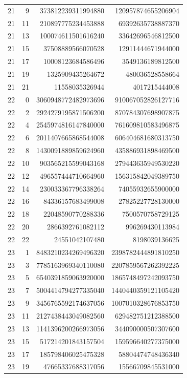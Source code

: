 \begin{longtable}{@{}rrrr@{}}
21 & 9 & 373812239311994880 & 120957874655206904\\
21 & 11 & 210897775234453888 & 69392635738887370\\
21 & 13 & 100074611501616240 & 33642696546812500\\
21 & 15 & 37508889566070528 & 12911444671944000\\
21 & 17 & 10008123684586496 & 3549136189812500\\
21 & 19 & 1325909435264672 & 480036528558664\\
21 & 21 & 11558035326944 & 4017215444008\\
22 & 0 & 3060948772482973696 & 910067052826127716\\
22 & 2 & 2924279195871506200 & 870784307698907875\\
22 & 4 & 2545974816147840000 & 761609810583496875\\
22 & 6 & 2011407665868544008 & 606404681680313750\\
22 & 8 & 1430091889859624960 & 435886931898469500\\
22 & 10 & 903565215599043168 & 279443635949530220\\
22 & 12 & 496557444710664960 & 156315842049389750\\
22 & 14 & 230033367796338264 & 74055932655900000\\
22 & 16 & 84336157683499008 & 27825227728130000\\
22 & 18 & 22048590770288336 & 7500570758729125\\
22 & 20 & 2866392761082112 & 996269430113984\\
22 & 22 & 24551042107480 & 8198039136625\\
23 & 1 & 8483210234269496320 & 2398782444891810250\\
23 & 3 & 7785163969340110080 & 2207859567262392225\\
23 & 5 & 6540391859063920000 & 1865748497242093750\\
23 & 7 & 5004414794277335040 & 1440440359121105420\\
23 & 9 & 3456765592174637056 & 1007010328676853750\\
23 & 11 & 2127438443049082560 & 629482751212388500\\
23 & 13 & 1141396200266973056 & 344090000507307600\\
23 & 15 & 517214201843157504 & 159596640277375000\\
23 & 17 & 185798406025475328 & 58804474748436340\\
23 & 19 & 47665337688317056 & 15566709845531000\\

\end{longtable}
